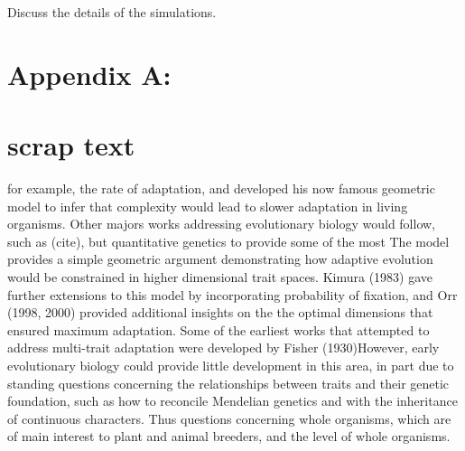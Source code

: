 \documentclass[11pt,one column]{article}
\begin{document}
\begin{multicols}{2}
Discuss the details of the simulations.



\end{multicols}

\newpage

\section*{Appendix A:}

\section*{scrap text}
 for example,  the rate of adaptation, and developed his now famous geometric model to infer that complexity would lead to slower adaptation in living organisms.  Other majors works addressing evolutionary biology would follow, such as (cite), but quantitative genetics to provide some of the most The model provides a simple geometric argument demonstrating how adaptive evolution would be constrained in higher dimensional trait spaces.  Kimura (1983) gave further extensions to this model by incorporating probability of fixation, and Orr (1998, 2000) provided additional insights on the the optimal dimensions that ensured maximum adaptation.  Some of the earliest works that attempted to address multi-trait adaptation were developed by Fisher (1930)However, early evolutionary biology could provide little development in this area, in part due to standing questions concerning the relationships between traits and their genetic foundation, such as how to reconcile Mendelian genetics and with the inheritance of continuous characters. Thus questions concerning whole organisms, which are of main interest to plant and animal breeders, and the level of whole organisms.\par
\end{document}
